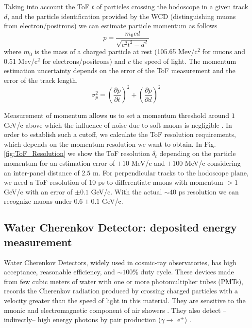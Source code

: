 \documentclass[letterpaper,11pt]{article}
\begin{document}
Taking into account the ToF $t$ of particles crossing the hodoscope in a given track $d$, and the particle identification provided by the WCD (distinguishing muons from electron/positrons) we can estimate particle momentum as follows
\begin{equation}
p = \frac{m_0 c d}{\sqrt{c^2t^2-d^2}}
\end{equation}
where $m_0$ is the mass of a charged particle at rest (105.65 Mev/c$^2$ for muons and 0.51 Mev/c$^2$ for electrons/positrons) and $c$ the speed of light. The momentum estimation uncertainty depends on the error of the ToF measurement and the error of the track length,
\begin{equation}
\sigma_p^2 = \left( \frac{\partial p}{\partial t} \right)^2 + \left( \frac{\partial p}{\partial d} \right)^2
\end{equation}

Measurement of momentum allows us to set a momentum threshold around $1$GeV/c above which the influence of noise due to soft muons is negligible \cite{nishiyama2016monte, nishiyama2014experimental, Olh2018, Olh2017, ambrosino2015joint}. In order to establish such a cutoff, we calculate the ToF resolution requirements, which depends on the momentum resolution we want to obtain. In Fig. \ref{fig:ToF_Resolution} we show the ToF resolution $\delta_t$ depending on the particle momentum for an estimation error of $\pm 10$ MeV/c and $\pm 100$ MeV/c considering an inter-panel distance of $2.5$ m. For perpendicular tracks to the hodoscope plane, we need a ToF resolution of $10$ ps to differentiate muons with momentum $> 1$ GeV/c with an error of $\pm 0.1$ GeV/c. With the actual $\sim 40$ ps resolution we can recognize muons under $0.6\pm 0.1$ GeV/c.

\subsection{Water Cherenkov Detector: deposited energy measurement}
Water Cherenkov Detectors, widely used in cosmic-ray observatories, has high acceptance, reasonable efficiency, and $\sim 100\%$ duty cycle. These devices made from few cubic meters of water with one or more photomultiplier tubes (PMTs), records the Cherenkov radiation produced by crossing charged particles with a velocity greater than the speed of light in this material. They are sensitive to the muonic and electromagnetic component of air showers \cite{Auger2015}. They also detect --indirectly-- high energy photons by pair production ($\gamma \rightarrow$ e$^{\pm}$) \cite{allard2007detecting, allard2008use, allekotte2008surface}. 
\end{document}
